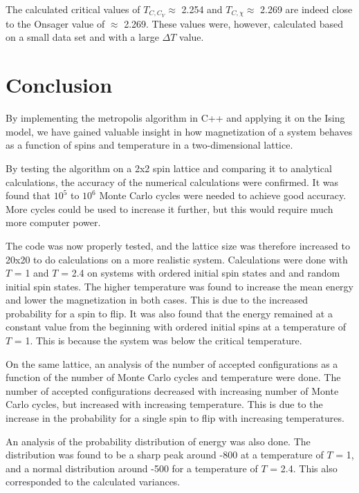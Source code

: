 \documentclass[10pt,a4paper,titlepage]{article}
\begin{document}
The calculated critical values of $T_{C,C_{V}} \approx$ 2.254 and $T_{C, \chi} \approx$ 2.269 are indeed close to the Onsager value of $\approx$ 2.269. These values were, however, calculated based on a small data set and with a large $\Delta T$ value. 




\section{Conclusion}
By implementing the metropolis algorithm in C++ and applying it on the Ising model, we have gained valuable insight in how magnetization of a system behaves as a function of spins and temperature in a two-dimensional lattice. 

By testing the algorithm on a 2x2 spin lattice and comparing it to analytical calculations, the accuracy of the numerical calculations were confirmed. It was found that $10^5$ to $10^6$ Monte Carlo cycles were needed to achieve good accuracy. More cycles could be used to increase it further, but this would require much more computer power. 

The code was now properly tested, and the lattice size was therefore increased to 20x20 to do calculations on a more realistic system. Calculations were done with $T$ = 1 and $T$ = 2.4  on systems with ordered initial spin states and and random initial spin states. The higher temperature was found to increase the mean energy and lower the magnetization in both cases. This is due to the increased probability for a spin to flip. It was also found that the energy remained at a constant value from the beginning with ordered initial spins at a temperature of $T$ = 1. This is because the system was below the critical temperature. 

On the same lattice, an analysis of the number of accepted configurations as a function of the number of Monte Carlo cycles and temperature were done. The number of accepted configurations decreased with increasing number of Monte Carlo cycles, but increased with increasing temperature. This is due to the increase in the probability for a single spin to flip with increasing temperatures. 

An analysis of the probability distribution of energy was also done. The distribution was found to be a sharp peak around -800 at a temperature of $T$ = 1, and a normal distribution around -500 for a temperature of $T$ = 2.4. This also corresponded to the calculated variances. 
\end{document}
